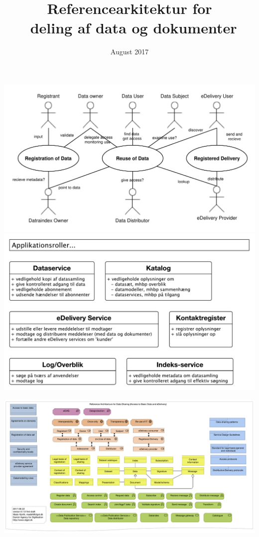\documentclass[12pt]{article}
\title{Referencearkitektur for \\ deling af data og dokumenter}
\author{}
\date{August 2017}
\begin{document}
\maketitle





\newpage
\thispagestyle{empty}
\includegraphics[width=\textwidth]{../usecases.pdf}
\includegraphics[width=\textwidth]{../tjenester.pdf}

\includegraphics[angle=90, height=\textheight]{../overview.pdf}
\end{document}

